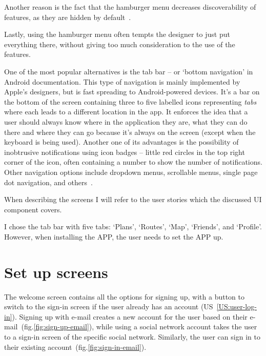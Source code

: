 Another reason is the fact that the hamburger menu decreases discoverability of features, as they are hidden by default~\cite{hamburger-discoverabillity}.

Lastly, using the hamburger menu often tempts the designer to just put everything there, without giving too much consideration to the use of the features.

One of the most popular alternatives is the tab bar -- or `bottom navigation' in Android documentation.
This type of navigation is mainly implemented by Apple's designers, but is fast spreading to Android-powered devices.
It's a bar on the bottom of the screen containing three to five labelled icons representing \textit{tabs} where each leads to a different location in the app.
It enforces the idea that a user should always know where in the application they are, what they can do there and where they can go because it's always on the screen (except when the keyboard is being used).
Another one of its advantages is the possibility of inobtrusive notifications using icon badges -- little red circles in the top right corner of the icon, often containing a number to show the number of notifications.
Other navigation options include dropdown menus, scrollable menus, single page dot navigation, and others~\cite{hamburger-alternatives}.

When describing the screens I will refer to the user stories which the discussed UI component covers.

I chose the tab bar with five tabs: `Plans', `Routes', `Map', `Friends', and `Profile'.
However, when installing the APP, the user needs to set the APP up.

\section{Set up screens}
The welcome screen contains all the options for signing up, with a button to switch to the sign-in screen if the user already has an account (US~\ref{US:user-log-in}).
Signing up with e-mail creates a new account for the user based on their e-mail~(fig.\ref{fig:sign-up-email}), while using a social network account takes the user to a sign-in screen of the specific social network.
Similarly, the user can sign in to their existing account~(fig.\ref{fig:sign-in-email}).

